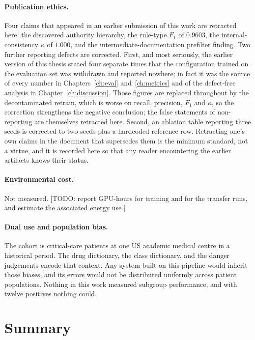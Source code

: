 \paragraph{Publication ethics.} Four claims that appeared in an earlier
submission of this work are retracted here: the discovered authority hierarchy,
the rule-type $F_1$ of $0.9603$, the internal-consistency $\kappa$ of $1.000$,
and the intermediate-documentation prefilter finding. Two further reporting
defects are corrected. First, and most seriously, the earlier version of this
thesis stated four separate times that the configuration trained on the
evaluation set was withdrawn and reported nowhere; in fact it was the source of
every number in Chapters~\ref{ch:eval} and~\ref{ch:metrics} and of the
defect-free analysis in Chapter~\ref{ch:discussion}. Those figures are replaced
throughout by the decontaminated retrain, which is worse on recall, precision,
$F_1$ and $\kappa$, so the correction strengthens the negative conclusion; the
false statements of non-reporting are themselves retracted here. Second, an
ablation table reporting three seeds is corrected to
two seeds plus a hardcoded reference row. Retracting one's own claims in the
document that supersedes them is the minimum standard, not a virtue, and it is
recorded here so that any reader encountering the earlier artifacts knows their
status.

\paragraph{Environmental cost.} Not measured. [TODO: report GPU-hours for
training and for the transfer runs, and estimate the associated energy use.]

\paragraph{Dual use and population bias.} The cohort is critical-care patients
at one US academic medical centre in a historical period. The drug dictionary,
the class dictionary, and the danger judgements encode that context. Any system
built on this pipeline would inherit those biases, and its errors would not be
distributed uniformly across patient populations. Nothing in this work measured
subgroup performance, and with twelve positives nothing could.

\section{Summary}
\label{sec:eval-summary}

